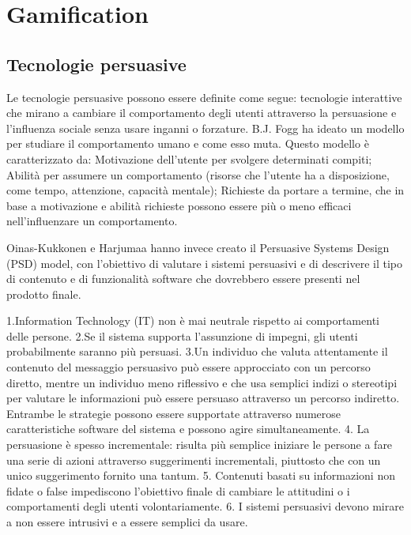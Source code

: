 \chapter{Gamification\label{sec:gamification}}

\section{Tecnologie persuasive\label{sec:tecnologie-persuasive}}

Le tecnologie persuasive possono essere definite come segue:
tecnologie interattive che mirano a cambiare il comportamento degli utenti attraverso la persuasione e l'influenza sociale senza usare inganni o forzature.
B.J. Fogg ha ideato un modello per studiare il comportamento umano e come esso muta.
Questo modello è caratterizzato da:
Motivazione dell'utente per svolgere determinati compiti;
Abilità per assumere un comportamento (risorse che l'utente ha a disposizione, come tempo, attenzione, capacità mentale);
Richieste da portare a termine, che in base a motivazione e abilità richieste possono essere più o meno efficaci nell'influenzare un comportamento.

Oinas-Kukkonen e Harjumaa hanno invece creato il Persuasive Systems Design (PSD) model, con l'obiettivo di valutare i sistemi persuasivi e di descrivere il tipo di contenuto e di funzionalità software che dovrebbero essere presenti nel prodotto finale.

1.Information Technology (IT) non è mai neutrale rispetto ai comportamenti delle persone.
2.Se il sistema supporta l'assunzione di impegni, gli utenti probabilmente saranno più persuasi.
3.Un individuo che valuta attentamente il contenuto del messaggio persuasivo può essere
approcciato con un percorso diretto, mentre un individuo meno riflessivo e che usa semplici indizi o stereotipi per valutare le informazioni può essere persuaso attraverso un percorso indiretto. Entrambe le strategie possono essere supportate attraverso numerose caratteristiche software del sistema e possono agire simultaneamente.
4. La persuasione è spesso incrementale: risulta più semplice iniziare le persone a fare una serie di azioni attraverso suggerimenti incrementali, piuttosto che con un unico suggerimento fornito una tantum.
5. Contenuti basati su informazioni non fidate o false impediscono l'obiettivo finale di cambiare le attitudini o i comportamenti degli utenti volontariamente.
6. I sistemi persuasivi devono mirare a non essere intrusivi e a essere semplici da usare.

